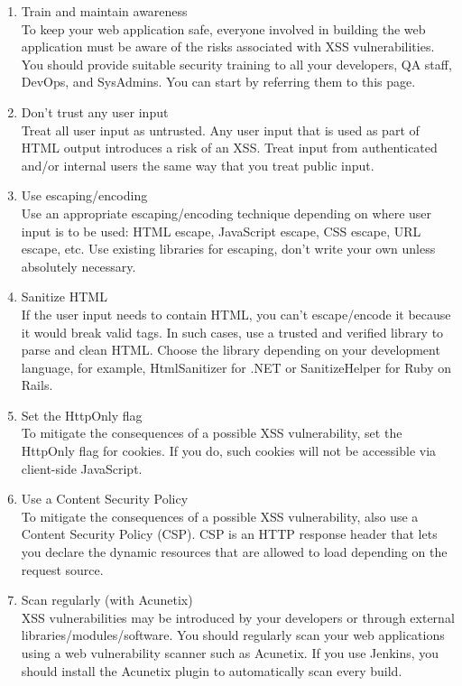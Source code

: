 \documentclass[a4paper, 12pt, fleqn]{article}
\begin{document}
\begin{enumerate}
	\item Train and maintain awareness \\
	To keep your web application safe, everyone involved in building the web
	application must be aware of the risks associated with XSS vulnerabilities.
	You should provide suitable security training to all your developers, QA
	staff, DevOps, and SysAdmins. You can start by referring them to this
	page.
	
	\item Don’t trust any user input \\
	Treat all user input as untrusted. Any user input that is used as part of
	HTML output introduces a risk of an XSS. Treat input from authenticated
	and/or internal users the same way that you treat public input.
	
	\item Use escaping/encoding \\
	Use an appropriate escaping/encoding technique depending on where
	user input is to be used: HTML escape, JavaScript escape, CSS escape,
	URL escape, etc. Use existing libraries for escaping, don’t write your own
	unless absolutely necessary.
	
	\item Sanitize HTML \\
	If the user input needs to contain HTML, you can’t escape/encode it
	because it would break valid tags. In such cases, use a trusted and verified
	library to parse and clean HTML. Choose the library depending on your
	development language, for example, HtmlSanitizer for .NET or
	SanitizeHelper for Ruby on Rails.
	
	\item Set the HttpOnly flag \\
	To mitigate the consequences of a possible XSS vulnerability, set the
	HttpOnly flag for cookies. If you do, such cookies will not be accessible via
	client-side JavaScript.
	
	\item Use a Content Security Policy \\
	To mitigate the consequences of a possible XSS vulnerability, also use a
	Content Security Policy (CSP). CSP is an HTTP response header that lets
	you declare the dynamic resources that are allowed to load depending on
	the request source.
	
	\item Scan regularly (with Acunetix) \\
	XSS vulnerabilities may be introduced by your developers or through
	external libraries/modules/software. You should regularly scan your web
	applications using a web vulnerability scanner such as Acunetix. If you use
	Jenkins, you should install the Acunetix plugin to automatically scan every
	build.
\end{enumerate}
\end{document}
